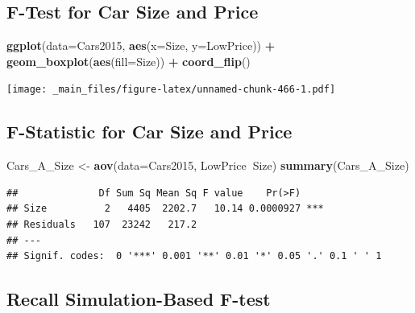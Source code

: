 \documentclass[]{book}
\newenvironment{Shaded}{\begin{snugshade}}{\end{snugshade}}
\newcommand{\KeywordTok}[1]{\textcolor[rgb]{0.13,0.29,0.53}{\textbf{#1}}}
\newcommand{\DataTypeTok}[1]{\textcolor[rgb]{0.13,0.29,0.53}{#1}}
\newcommand{\DecValTok}[1]{\textcolor[rgb]{0.00,0.00,0.81}{#1}}
\newcommand{\StringTok}[1]{\textcolor[rgb]{0.31,0.60,0.02}{#1}}
\newcommand{\OperatorTok}[1]{\textcolor[rgb]{0.81,0.36,0.00}{\textbf{#1}}}
\newcommand{\NormalTok}[1]{#1}
\begin{document}
\subsection{F-Test for Car Size and
Price}\label{f-test-for-car-size-and-price}

\begin{Shaded}
\begin{Highlighting}[]
\KeywordTok{ggplot}\NormalTok{(}\DataTypeTok{data=}\NormalTok{Cars2015, }\KeywordTok{aes}\NormalTok{(}\DataTypeTok{x=}\NormalTok{Size, }\DataTypeTok{y=}\NormalTok{LowPrice)) }\OperatorTok{+}\StringTok{ }\KeywordTok{geom_boxplot}\NormalTok{(}\KeywordTok{aes}\NormalTok{(}\DataTypeTok{fill=}\NormalTok{Size)) }\OperatorTok{+}\StringTok{ }\KeywordTok{coord_flip}\NormalTok{() }
\end{Highlighting}
\end{Shaded}

\texttt{[image: \_main\_files/figure-latex/unnamed-chunk-466-1.pdf]}

\subsection{F-Statistic for Car Size and
Price}\label{f-statistic-for-car-size-and-price-1}

\begin{Shaded}
\begin{Highlighting}[]
\NormalTok{Cars_A_Size <-}\StringTok{ }\KeywordTok{aov}\NormalTok{(}\DataTypeTok{data=}\NormalTok{Cars2015, LowPrice}\OperatorTok{~}\NormalTok{Size)}
\KeywordTok{summary}\NormalTok{(Cars_A_Size)}
\end{Highlighting}
\end{Shaded}

\begin{verbatim}
##              Df Sum Sq Mean Sq F value    Pr(>F)    
## Size          2   4405  2202.7   10.14 0.0000927 ***
## Residuals   107  23242   217.2                      
## ---
## Signif. codes:  0 '***' 0.001 '**' 0.01 '*' 0.05 '.' 0.1 ' ' 1
\end{verbatim}

\subsection{Recall Simulation-Based
F-test}\label{recall-simulation-based-f-test}

\begin{Shaded}
\end{Shaded}
\end{document}
